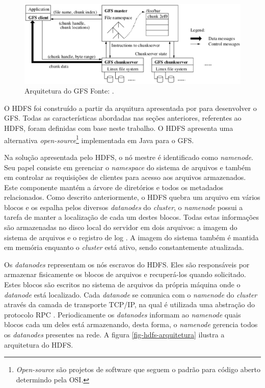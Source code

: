 \begin{figure}[ht!]
	\centering
	\includegraphics[keepaspectratio=true,scale=0.5]
	  {figuras/gfs.eps}
	\caption[Arquitetura do GFS]{Arquitetura do GFS
	\protect\linebreak Fonte: \cite{ghemawatGfs2003}.}
	\label{fig-gfs}
\end{figure}
\FloatBarrier

O HDFS foi construído a partir da arquitura apresentada por  para desenvolver o GFS. Todas as características abordadas nas seções anteriores, referentes ao HDFS, foram definidas com base neste trabalho. O HDFS apresenta uma alternativa \textit{open-source}\footnote{\textit{Open-source} são projetos de software que seguem o padrão para código aberto determindo pela OSI.} implementada em Java para o GFS.

Na solução apresentada pelo HDFS, o nó mestre é identificado como \textit{namenode}. Seu papel consiste em gerenciar o \textit{namespace} do sistema de arquivos e também em controlar as requisições de clientes para acesso aos arquivos armazenados. Este componente mantém a árvore de diretórios e todos os metadados relacionados. Como descrito anteriormente, o HDFS quebra um arquivo em vários blocos e os espalha pelos diversos \textit{datanodes} do \textit{cluster}, o \textit{namenode} possui a tarefa de manter a localização de cada um destes blocos. Todas estas informações são armazenadas no disco local do servidor em dois arquivos: a imagem do sistema de arquivos e o registro de log \cite{white2012}. A imagem do sistema também é mantida em memória enquanto o \textit{cluster} está ativo, sendo constantemente atualizada.

Os \textit{datanodes} representam os nós escravos do HDFS. Eles são responsáveis por armazenar fisicamente os blocos de arquivos e recuperá-los quando solicitado. Estes blocos são escritos no sistema de arquivos da própria máquina onde o \textit{datanode} está localizado. Cada \textit{datanode} se comunica com o \textit{namenode} do \textit{cluster} através da camada de transporte TCP/IP, na qual é utilizada uma abstração do protocolo RPC \cite{hadoopSiteHDFS}. Periodicamente os \textit{datanodes} informam ao \textit{namenode} quais blocos cada um deles está armazenando, desta forma, o \textit{namenode} gerencia todos os \textit{datanodes} presentes na rede. A figura \ref{fig-hdfs-arquitetura} ilustra a arquitetura do HDFS.

